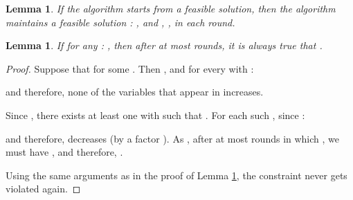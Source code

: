 \documentclass[11pt]{article}
\newtheorem{lemma}[theorem]{Lemma}
\newif\iffullpaper
\begin{document}
\begin{lemma}\label{lemma:feasibility}
If the algorithm starts from a feasible solution, then the algorithm maintains a feasible solution : ,  and , , in each round.
\end{lemma}
\iffullpaper
\begin{proof}
By the statement of the lemma, the solution is feasible initially. From the way that the algorithm makes updates to the variables , it is always true that , .

Now assume that  becomes infeasible in some round, and let  denote the (feasible) solution before that round,  denote the (infeasible) solution after the round. We have:

For this to be true,  must have increased over at least one coordinate  such that . For such a change to be triggered by the algorithm, it must also be true that:

Since, by the choice of , this term can increase by a factor of at most , it follows that:

This further implies:

and since whenever  we also have , we get:

On the other hand, since , , and :

which contradicts (\ref{eq:feasibility-less-that-wj}).
\end{proof}
\fi

\begin{lemma}\label{lemma:self-stabilization}
If for any : , then after at most  rounds, it is always true that .
\end{lemma}
\begin{proof}
Suppose that  for some . Then , and for every  with :

and therefore, none of the variables that appear in  increases.

Since , there exists at least one  with  such that . For each such , since :

and therefore,  decreases (by a factor ). As , after at most  rounds in which , we must have , and therefore, .
 
Using the same arguments as in the proof of Lemma \ref{lemma:feasibility}, the constraint  never gets violated again.
\end{proof}
\end{document}
